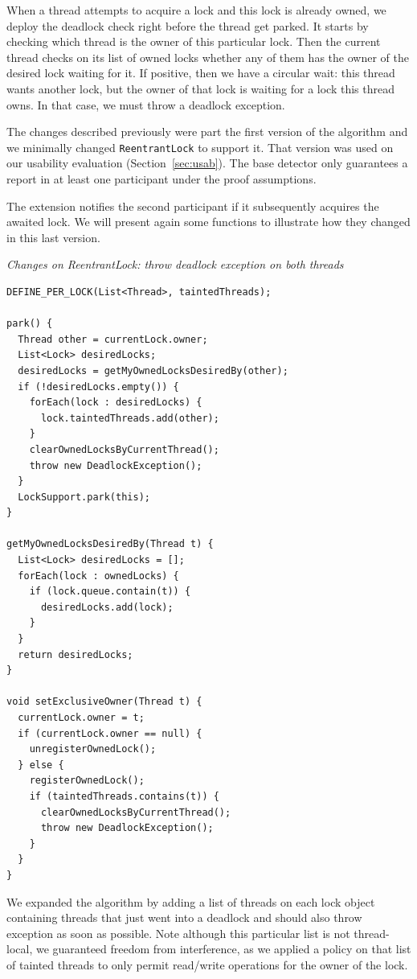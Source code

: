 When a thread attempts to acquire a lock and this lock is already owned, we deploy the deadlock check right before the thread get parked.
It starts by checking which thread is the owner of this particular lock.
Then the current thread checks on its list of owned locks whether any of them has the owner of the desired lock waiting for it.
If positive, then we have a circular wait: this thread wants another lock, but the owner of that lock is waiting for a lock this thread owns.
In that case, we must throw a deadlock exception.

The changes described previously were part the first version of the algorithm and we minimally changed {\tt ReentrantLock} to support it.
That version was used on our usability evaluation (Section~\ref{sec:usab}).
The base detector only guarantees a report in at least one participant under the proof assumptions.

The extension notifies the second participant if it subsequently acquires the awaited lock.
We will present again some functions to illustrate how they changed in this last version.

\medskip
\noindent
{\it Changes on ReentrantLock: throw deadlock exception on both threads}
\begin{verbatim}
DEFINE_PER_LOCK(List<Thread>, taintedThreads);

park() {
  Thread other = currentLock.owner;
  List<Lock> desiredLocks;
  desiredLocks = getMyOwnedLocksDesiredBy(other);
  if (!desiredLocks.empty()) {
    forEach(lock : desiredLocks) {
      lock.taintedThreads.add(other);
    }
    clearOwnedLocksByCurrentThread();
    throw new DeadlockException();
  }
  LockSupport.park(this);
}

getMyOwnedLocksDesiredBy(Thread t) {
  List<Lock> desiredLocks = [];
  forEach(lock : ownedLocks) {
    if (lock.queue.contain(t)) {
      desiredLocks.add(lock);
    }
  }
  return desiredLocks;
}

void setExclusiveOwner(Thread t) {
  currentLock.owner = t;
  if (currentLock.owner == null) {
    unregisterOwnedLock();
  } else {
    registerOwnedLock();
    if (taintedThreads.contains(t)) {
      clearOwnedLocksByCurrentThread();
      throw new DeadlockException();
    }
  }
}

\end{verbatim}

We expanded the algorithm by adding a list of threads on each lock object containing threads that just went into a deadlock and should also throw exception as soon as possible.
Note although this particular list is not thread-local, we guaranteed freedom from interference,
as we applied a policy on that list of tainted threads to only permit read/write operations for the owner of the lock.

